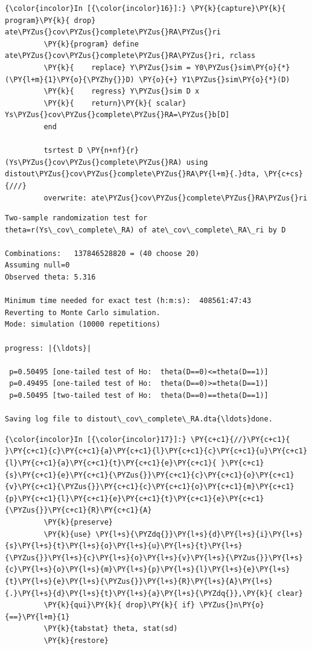 \documentclass[11pt,notitlepage]{article}\usepackage[]{graphicx}\usepackage[]{color}
\makeatletter
\newenvironment{kframe}{%
 \def\at@end@of@kframe{}%
 \ifinner\ifhmode%
  \def\at@end@of@kframe{\end{minipage}}%
  \begin{minipage}{\columnwidth}%
 \fi\fi%
 \def\FrameCommand##1{\hskip\@totalleftmargin \hskip-\fboxsep
 \colorbox{shadecolor}{##1}\hskip-\fboxsep
     \hskip-\linewidth \hskip-\@totalleftmargin \hskip\columnwidth}%
 \MakeFramed {\advance\hsize-\width
   \@totalleftmargin\z@ \linewidth\hsize
   \@setminipage}}%
 {\par\unskip\endMakeFramed%
 \at@end@of@kframe}
\newenvironment{knitrout}{}{} %
\makeatother
\begin{document}
\begin{enumerate}[a)]
\begin{knitrout}
\begin{kframe}
    \begin{Verbatim}[commandchars=\\\{\}]
{\color{incolor}In [{\color{incolor}16}]:} \PY{k}{capture}\PY{k}{ program}\PY{k}{ drop} ate\PYZus{}cov\PYZus{}complete\PYZus{}RA\PYZus{}ri
         \PY{k}{program} define ate\PYZus{}cov\PYZus{}complete\PYZus{}RA\PYZus{}ri, rclass
         \PY{k}{	replace} Y\PYZus{}sim = Y0\PYZus{}sim\PY{o}{*}(\PY{l+m}{1}\PY{o}{\PYZhy{}}D) \PY{o}{+} Y1\PYZus{}sim\PY{o}{*}(D) 
         \PY{k}{	regress} Y\PYZus{}sim D x
         \PY{k}{    return}\PY{k}{ scalar} Ys\PYZus{}cov\PYZus{}complete\PYZus{}RA=\PYZus{}b[D]	
         end
         
         tsrtest D \PY{n+nf}{r}(Ys\PYZus{}cov\PYZus{}complete\PYZus{}RA) using distout\PYZus{}cov\PYZus{}complete\PYZus{}RA\PY{l+m}{.}dta, \PY{c+cs}{///}
         overwrite: ate\PYZus{}cov\PYZus{}complete\PYZus{}RA\PYZus{}ri
\end{Verbatim}

    \begin{Verbatim}[commandchars=\\\{\}]
Two-sample randomization test for 
theta=r(Ys\_cov\_complete\_RA) of ate\_cov\_complete\_RA\_ri by D

Combinations:   137846528820 = (40 choose 20)
Assuming null=0
Observed theta: 5.316

Minimum time needed for exact test (h:m:s):  408561:47:43
Reverting to Monte Carlo simulation.
Mode: simulation (10000 repetitions)

progress: |{\ldots}|

 p=0.50495 [one-tailed test of Ho:  theta(D==0)<=theta(D==1)]
 p=0.49495 [one-tailed test of Ho:  theta(D==0)>=theta(D==1)]
 p=0.50495 [two-tailed test of Ho:  theta(D==0)==theta(D==1)]

Saving log file to distout\_cov\_complete\_RA.dta{\ldots}done.

    \end{Verbatim}

    \begin{Verbatim}[commandchars=\\\{\}]
{\color{incolor}In [{\color{incolor}17}]:} \PY{c+c1}{//}\PY{c+c1}{ }\PY{c+c1}{c}\PY{c+c1}{a}\PY{c+c1}{l}\PY{c+c1}{c}\PY{c+c1}{u}\PY{c+c1}{l}\PY{c+c1}{a}\PY{c+c1}{t}\PY{c+c1}{e}\PY{c+c1}{ }\PY{c+c1}{s}\PY{c+c1}{e}\PY{c+c1}{\PYZus{}}\PY{c+c1}{c}\PY{c+c1}{o}\PY{c+c1}{v}\PY{c+c1}{\PYZus{}}\PY{c+c1}{c}\PY{c+c1}{o}\PY{c+c1}{m}\PY{c+c1}{p}\PY{c+c1}{l}\PY{c+c1}{e}\PY{c+c1}{t}\PY{c+c1}{e}\PY{c+c1}{\PYZus{}}\PY{c+c1}{R}\PY{c+c1}{A}
         \PY{k}{preserve}
         \PY{k}{use} \PY{l+s}{\PYZdq{}}\PY{l+s}{d}\PY{l+s}{i}\PY{l+s}{s}\PY{l+s}{t}\PY{l+s}{o}\PY{l+s}{u}\PY{l+s}{t}\PY{l+s}{\PYZus{}}\PY{l+s}{c}\PY{l+s}{o}\PY{l+s}{v}\PY{l+s}{\PYZus{}}\PY{l+s}{c}\PY{l+s}{o}\PY{l+s}{m}\PY{l+s}{p}\PY{l+s}{l}\PY{l+s}{e}\PY{l+s}{t}\PY{l+s}{e}\PY{l+s}{\PYZus{}}\PY{l+s}{R}\PY{l+s}{A}\PY{l+s}{.}\PY{l+s}{d}\PY{l+s}{t}\PY{l+s}{a}\PY{l+s}{\PYZdq{}},\PY{k}{ clear}
         \PY{k}{qui}\PY{k}{ drop}\PY{k}{ if} \PYZus{}n\PY{o}{==}\PY{l+m}{1}
         \PY{k}{tabstat} theta, stat(sd)
         \PY{k}{restore}
\end{Verbatim}


\end{kframe}
\end{knitrout}
\end{enumerate}
\end{document}
